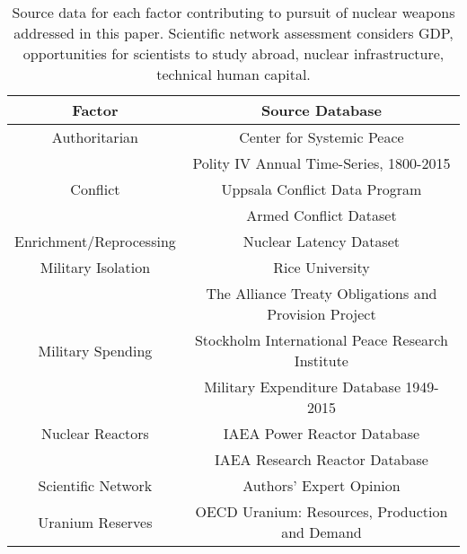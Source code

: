 \begin{table}
\centering
\begin{tabular}{|c|c|}
\hline
\textbf{Factor}        & \textbf{Source Database} \\
\hline
Authoritarian            & Center for Systemic Peace \\
                          & Polity IV Annual Time-Series, 1800-2015\cite{polity_scores}\\
\hline
Conflict & Uppsala Conflict Data Program \\
         & Armed Conflict Dataset\cite{conflict_ref} \\
\hline
Enrichment/Reprocessing   & Nuclear Latency Dataset \cite{latency_ref} \\
\hline
Military Isolation & Rice University \\
& The Alliance Treaty Obligations and Provision Project\cite{mil_iso}\\
\hline
Military Spending & Stockholm International Peace Research Institute \\
    & Military Expenditure Database 1949-2015\cite{mil_sp} \\
\hline
Nuclear Reactors           &  IAEA Power Reactor Database \cite{power_react}\\

                         & IAEA Research Reactor Database \cite{research_react}\\
\hline
Scientific Network     & Authors' Expert Opinion \\
\hline
Uranium Reserves  &    OECD Uranium: Resources, Production and Demand \cite{noauthor_uranium_2014} \\
\hline
\end{tabular}
\caption{Source data for each factor contributing to pursuit of nuclear weapons addressed in this paper. Scientific network assessment considers GDP, opportunities for scientists to study abroad, nuclear infrastructure, technical human capital.}
\label{tab:factor_sources}
\end{table}

